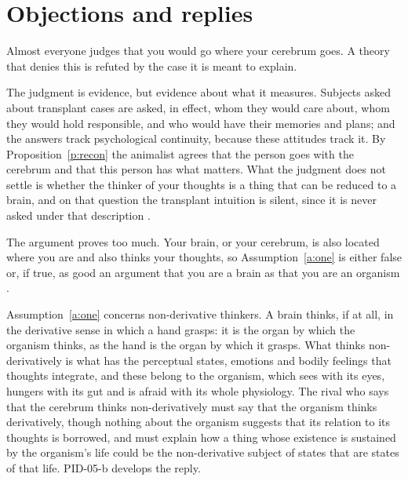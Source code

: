 \documentclass{situationist-preprint}
\begin{document}
\section{Objections and replies}\label{s:obj}

\begin{objection}
Almost everyone judges that you would go where your cerebrum goes. A theory that denies this is refuted by the case it is meant to explain.
\end{objection}

\begin{reply}
The judgment is evidence, but evidence about what it measures. Subjects asked about transplant cases are asked, in effect, whom they would care about, whom they would hold responsible, and who would have their memories and plans; and the answers track psychological continuity, because these attitudes track it. By Proposition~\ref{p:recon} the animalist agrees that the person goes with the cerebrum and that this person has what matters. What the judgment does not settle is whether the thinker of your thoughts is a thing that can be reduced to a brain, and on that question the transplant intuition is silent, since it is never asked under that description \citep{Snowdon1990,Olson1997}.
\end{reply}

\begin{objection}
The argument proves too much. Your brain, or your cerebrum, is also located where you are and also thinks your thoughts, so Assumption~\ref{a:one} is either false or, if true, as good an argument that you are a brain as that you are an organism \citep{McMahan2002,Parfit2012}.
\end{objection}

\begin{reply}
Assumption~\ref{a:one} concerns non-derivative thinkers. A brain thinks, if at all, in the derivative sense in which a hand grasps: it is the organ by which the organism thinks, as the hand is the organ by which it grasps. What thinks non-derivatively is what has the perceptual states, emotions and bodily feelings that thoughts integrate, and these belong to the organism, which sees with its eyes, hungers with its gut and is afraid with its whole physiology. The rival who says that the cerebrum thinks non-derivatively must say that the organism thinks derivatively, though nothing about the organism suggests that its relation to its thoughts is borrowed, and must explain how a thing whose existence is sustained by the organism's life could be the non-derivative subject of states that are states of that life. PID-05-b develops the reply.
\end{reply}
\end{document}
